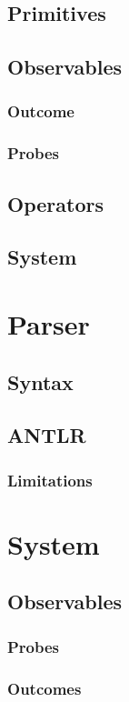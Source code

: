         \subsection{Primitives}
        \subsection{Observables}
            \subsubsection{Outcome}
            \subsubsection{Probes}
        \subsection{Operators}
        \subsection{System}
        
    \section{Parser}
        \subsection{Syntax}
        \subsection{ANTLR}
            \subsubsection{Limitations}
   
    \section{System}
        \subsection{Observables}
            \subsubsection{Probes}
            \subsubsection{Outcomes}

